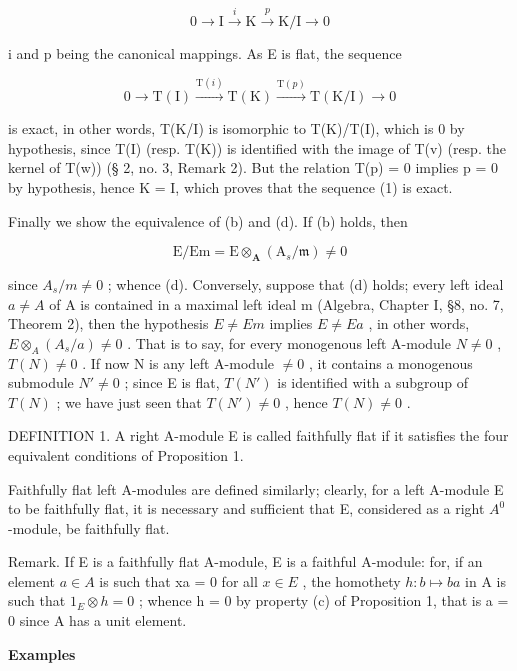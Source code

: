 \[
0 \longrightarrow \mathrm{I} \stackrel {i} {\longrightarrow} \mathrm{K} \stackrel {p} {\longrightarrow} \mathrm{K} / \mathrm{I} \longrightarrow 0
\]

i and p being the canonical mappings. As E is flat, the sequence

\[
0 \longrightarrow \mathrm{T} (\mathrm{I}) \xrightarrow {\mathrm{T} (i)} \mathrm{T} (\mathrm{K}) \xrightarrow {\mathrm{T} (p)} \mathrm{T} (\mathrm{K} / \mathrm{I}) \longrightarrow 0
\]

is exact, in other words, T(K/I) is isomorphic to T(K)/T(I), which is 0 by hypothesis, since T(I) (resp. T(K)) is identified with the image of T(v) (resp. the kernel of T(w)) (§ 2, no. 3, Remark 2). But the relation T(p) = 0 implies p = 0 by hypothesis, hence K = I, which proves that the sequence (1) is exact.

Finally we show the equivalence of (b) and (d). If (b) holds, then

\[
\mathrm{E} / \mathrm{Em} = \mathrm{E} \otimes_ {\mathbf {A}} (\mathrm{A} _ {s} / \mathfrak {m}) \neq 0
\]

since \(A_{s}/m \neq 0\) ; whence (d). Conversely, suppose that (d) holds; every left ideal \(a \neq A\) of A is contained in a maximal left ideal m (Algebra, Chapter I, §8, no. 7, Theorem 2), then the hypothesis \(E \neq Em\) implies \(E \neq Ea\) , in other words, \(E \otimes_{A} (A_{s}/a) \neq 0\) . That is to say, for every monogenous left A-module \(N \neq 0\) , \(T(N) \neq 0\) . If now N is any left A-module \(\neq 0\) , it contains a monogenous submodule \(N' \neq 0\) ; since E is flat, \(T(N')\) is identified with a subgroup of \(T(N)\) ; we have just seen that \(T(N') \neq 0\) , hence \(T(N) \neq 0\) .

DEFINITION 1. A right A-module E is called faithfully flat if it satisfies the four equivalent conditions of Proposition 1.

Faithfully flat left A-modules are defined similarly; clearly, for a left A-module E to be faithfully flat, it is necessary and sufficient that E, considered as a right \(A^{0}\) -module, be faithfully flat.

Remark. If E is a faithfully flat A-module, E is a faithful A-module: for, if an element \(a \in A\) is such that xa = 0 for all \(x \in E\) , the homothety \(h: b \mapsto ba\) in A is such that \(1_{E} \otimes h = 0\) ; whence h = 0 by property (c) of Proposition 1, that is a = 0 since A has a unit element.

\textbf{Examples}\par

